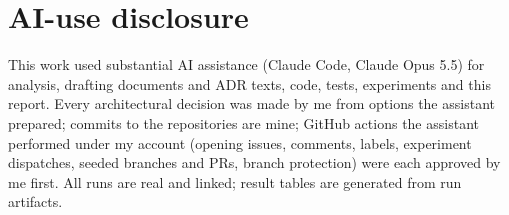 \documentclass[10pt,a4paper]{article}
\begin{document}
\section{AI-use disclosure}
This work used substantial AI assistance (Claude Code, Claude Opus 5.5) for analysis, drafting documents and ADR texts,
code, tests, experiments and this report. Every architectural decision was made by me from options the assistant
prepared; commits to the repositories are mine; GitHub actions the assistant performed under my account (opening issues,
comments, labels, experiment dispatches, seeded branches and PRs, branch protection) were each approved by me first.
All runs are real and linked; result tables are generated from run artifacts.
\end{document}
